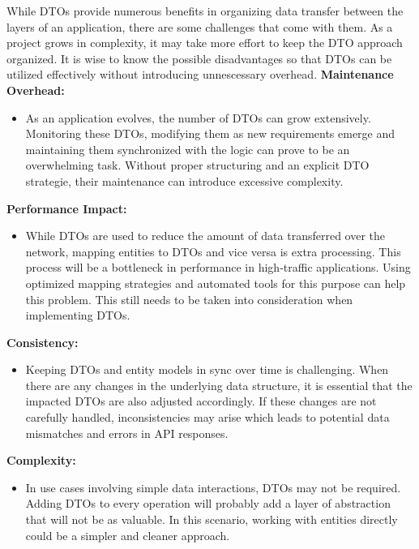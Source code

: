     While DTOs provide numerous benefits in organizing data transfer between the layers of an application, there are some challenges that come with them. As a project grows in complexity, it may take more effort to keep the DTO approach organized. It is wise to know the possible disadvantages so that DTOs can be utilized effectively without introducing unnescessary overhead. \newline
    \textbf{Maintenance Overhead:}
    \begin{itemize}
        \item As an application evolves, the number of DTOs can grow extensively. Monitoring these DTOs, modifying them as new requirements emerge and maintaining them synchronized with the logic can prove to be an overwhelming task. Without proper structuring and an explicit DTO strategie, their maintenance can introduce excessive complexity.
    \end{itemize}
    \textbf{Performance Impact:}
    \begin{itemize}
        \item While DTOs are used to reduce the amount of data transferred over the network, mapping entities to DTOs and vice versa is extra processing. This process will be a bottleneck in performance in high-traffic applications. Using optimized mapping strategies and automated tools for this purpose can help this problem. This still needs to be taken into consideration when implementing DTOs.
    \end{itemize}
    \textbf{Consistency:}
    \begin{itemize}
        \item Keeping DTOs and entity models in sync over time is challenging. When there are any changes in the underlying data structure, it is essential that the impacted DTOs are also adjusted accordingly. If these changes are not carefully handled, inconsistencies may arise which leads to potential data mismatches and errors in API responses.
    \end{itemize}
    \textbf{Complexity:}
    \begin{itemize}
        \item In use cases involving simple data interactions, DTOs may not be required. Adding DTOs to every operation will probably add a layer of abstraction that will not be as valuable. In this scenario, working with entities directly could be a simpler and cleaner approach.
    \end{itemize}
    
